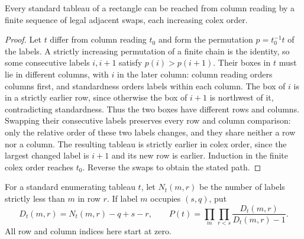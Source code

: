\begin{lemma}
\label{lem:standard-adjacent-path}
\leanok
Every standard tableau of a rectangle can be reached from column reading
by a finite sequence of legal adjacent swaps, each increasing colex order.
\end{lemma}
\begin{proof}
Let $t$ differ from column reading $t_0$ and form the permutation
$p=t_0^{-1}t$ of the labels. A strictly increasing permutation of a finite
chain is the identity, so some consecutive labels $i,i+1$ satisfy
$p(i)>p(i+1)$. Their boxes in $t$ must lie in different columns, with
$i$ in the later column: column reading orders columns first, and
standardness orders labels within each column. The box of $i$ is in a
strictly earlier row, since otherwise the box of $i+1$ is northwest of
it, contradicting standardness. Thus the two boxes have different rows
and columns. Swapping their consecutive labels preserves every row and
column comparison: only the relative order of these two labels changes,
and they share neither a row nor a column. The resulting tableau is
strictly earlier in colex order, since the largest changed label is
$i+1$ and its new row is earlier. Induction in the finite colex order
reaches $t_0$. Reverse the swaps to obtain the stated path.
\end{proof}

\begin{definition}
\label{def:prefix-norm-product}
\leanok
For a standard enumerating tableau $t$, let $N_t(m,r)$ be the number of labels
strictly less than $m$ in row $r$. If label $m$ occupies $(s,q)$, put
\[
 D_t(m,r)=N_t(m,r)-q+s-r,\qquad
 P(t)=\prod_m\prod_{r<s}\frac{D_t(m,r)}{D_t(m,r)-1}.
\]
All row and column indices here start at zero.
\end{definition}


